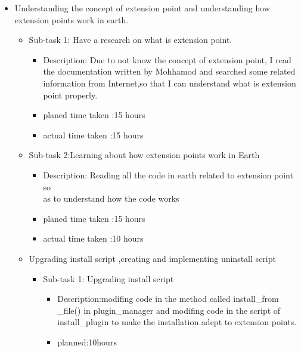 \begin{itemize}
    \item Understanding the concept of extension point and understanding how extension points work in earth.
        \begin{itemize}
            \item Sub-task 1: Have a research on what is extension point. 
                \begin{itemize}
                   \item Description: Due to not know the concept of extension point, I read the documentation written by Mohhamod and searched some related information from Internet,so that I can understand what is extension point properly.
                   \item planed time taken :15 hours\\
                   \item actual time taken :15 hours\\
                \end{itemize}
            \item Sub-task 2:Learning about how extension points work in Earth
                \begin{itemize}
                    \item Description: Reading all the code in earth related to extension point so \\  as to understand how the code works 
                    \item planed time taken :15 hours\\
                    \item actual time taken :10 hours\\
                \end{itemize}              
            \item Upgrading install script ,creating and implementing uninstall script
                \begin{itemize}
                    \item Sub-task 1:  Upgrading install script
                        \begin{itemize}
                            \item Description:modifing code in the method called install\_from \_file() in plugin\_manager and modifing code in the script of\\        install\_plugin to make the installation adept to extension points.\\
                            \item planned:10hours\\

\end{itemize}
\end{itemize}
\end{itemize}
\end{itemize}
